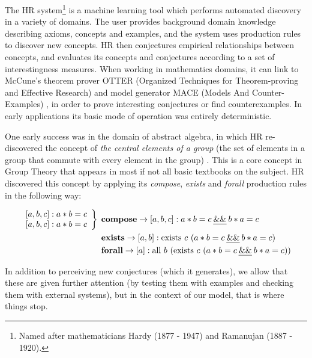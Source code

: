 \begin{ep}\label{ex:central}
The {\sf HR} system\footnote{Named after mathematicians Hardy (1877 - 1947) and Ramanujan (1887 - 1920).} \citet{colton2002automated} is a machine learning tool which performs automated discovery in a variety of domains. The user provides background domain knowledge describing axioms, concepts and examples, and the system uses production rules to discover new concepts.  HR then conjectures empirical relationships between concepts, and evaluates its concepts and conjectures according to a set of interestingness measures.  When working in mathematics domains, it can link to McCune's theorem prover {\sf OTTER} (Organized Techniques for Theorem-proving and Effective Research)\cite{mccune:90} and model generator {\sf MACE} (Models And Counter-Examples) \cite{mccune:macemanual,zhang}, in order to prove interesting conjectures or find counterexamples.  In early applications its basic mode of operation was entirely deterministic.

One early success was in the domain of abstract algebra, in which {\sf HR} re-discovered the concept of \emph{the central elements of a group} (the set of elements in a group that commute with every element in the group) \cite{colton2002automated}.  This is a core concept in Group Theory that appears in most if not all basic textbooks on the subject.  HR discovered this concept by applying its {\em compose}, {\em exists} and {\em forall} production rules in the following way:  

\begin{align*}
\left.
\begin{array}{c}
{[}a,b,c{]} : a*b=c\\
{[}a,b,c{]} : a*b=c
\end{array}
\right\}\:\:
&\mathbf{compose}\rightarrow [a,b,c] : a*b=c \:\text{\emph{\&\&}}\: b*a=c\\
&\mathbf{exists}\rightarrow [a,b] : \text{exists}\ c\ (a*b=c \:\text{\emph{\&\&}}\: b*a=c)\\
&\mathbf{forall}\rightarrow [a] : \text{all}\ b\ (\text{exists}\ c\ (a*b=c \:\text{\emph{\&\&}}\: b*a=c))
\end{align*}
\end{ep}

In addition to perceiving new conjectures (which it generates), we allow that these are given further attention (by testing them with examples and checking them with external systems), but in the context of our model, that is where things stop.

